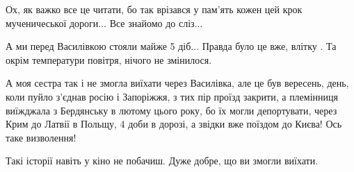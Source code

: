  
 
 
 
 

\qqSecCmt


Ох, як важко все це читати, бо так врізався у пам'ять кожен цей крок
мученичеської дороги... Все знайомо до сліз...


А ми перед Василівкою стояли майже 5 діб... Правда було це вже, влітку . Та
окрім температури повітря, нічого не змінилося.


А моя сестра так і не змогла виїхати через Василівка, але це був вересень,
день, коли пуйло з'єднав росію і Запоріжжя, з тих пір проїзд закрити, а
племінниця виїжджала з Бердянську в лютому цього року, бо їх могли депортувати,
через Крим до Латвії в Польщу, 4 доби в дорозі, а звідки вже поїздом до Києва!
Ось таке визволення!


Такі історії навіть у кіно не побачиш. Дуже добре, що ви змогли виїхати.
